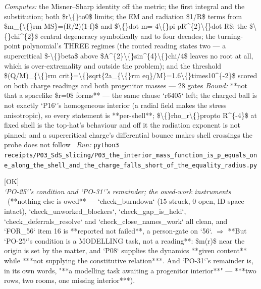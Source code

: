 \begin{description}
\emph{Computes:} the Misner--Sharp identity off the metric; the first integral and the substitution; both \$r\textbackslash\{\}to0\$ limits; the EM and radiation \$1/R\$ terms from \$m\_\{\textbackslash\{\}rm MS\}=(R/2)(1-f)\$ and \$\textbackslash\{\}dot m=-4\textbackslash\{\}pi pR\textasciicircum{}\{2\}\textbackslash\{\}dot R\$; the \$\textbackslash\{\}chi\textasciicircum{}\{2\}\$ central degeneracy symbolically and to four decades; the turning-point polynomial's THREE regimes (the routed reading states two --- a supercritical \$-\textbackslash\{\}beta\$ above \$A\textasciicircum{}\{2\}\textbackslash\{\}sin\textasciicircum{}\{4\}\textbackslash\{\}chi/4\$ leaves no root at all, which is over-extremality and outside the problem); and the threshold \$(Q/M)\_\{\textbackslash\{\}rm crit\}=\textbackslash\{\}sqrt\{2a\_\{\textbackslash\{\}rm eq\}/M\}=1.6\textbackslash\{\}times10\textasciicircum{}\{-2\}\$ scored on both charge readings and both progenitor masses --- 28 gates
 \emph{Bound:}  **not that a spacelike \$r=0\$ forms** --- the same clause `r6405` left; the charged ball is not exactly `P16`'s homogeneous interior (a radial field makes the stress anisotropic), so every statement is **per-shell**; \$\textbackslash\{\}rho\_r\textbackslash\{\}propto R\textasciicircum{}\{-4\}\$ at fixed shell is the top-hat's behaviour and off it the radiation exponent is not pinned; and a supercritical charge's differential bounce makes shell crossings the probe does not follow
\ \emph{Run:} \texttt{python3 receipts/P03\_SdS\_slicing/P03\_the\_interior\_mass\_function\_is\_p\_equals\_one\_along\_the\_shell\_and\_the\_charge\_falls\_short\_of\_the\_equality\_radius.py}
\item[\rcptlabel{P03_the_last_two_openings_await_the_same_interior}{P3R26}\textbf{P3R26}\quad\texttt{P03\_the\_last\_two\_openings\_await\_the\_same\_interior}]\hfill\textsf{[OK]}\\
\textit{`PO-25`'s condition and `PO-31`'s remainder; the owed-work instruments} \ (**nothing else is owed** --- `check\_burndown` (15 struck, 0 open, ID space intact), `check\_unworked\_blockers`, `check\_gap\_is\_held`, `check\_deferrals\_resolve` and `check\_close\_names\_work` all clean, and `FOR\_56` item 16 is **reported not failed**, a person-gate on `56`. \ensuremath{\Rightarrow} **But `PO-25`'s condition is a MODELLING task, not a reading**: \$m(r)\$ near the origin is set by the matter, and `P08` supplies the dynamics **given content** while ***not supplying the constitutive relation***. And `PO-31`'s remainder is, in its own words, "**a modelling task awaiting a progenitor interior**" --- ***two rows, two rooms, one missing interior***). 

\end{description}
